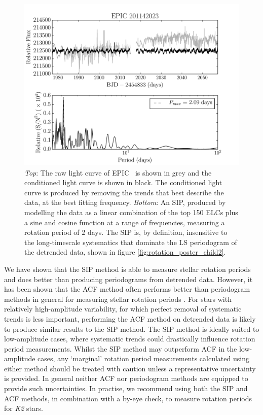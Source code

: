 \begin{figure}
\begin{center}
\includegraphics[width=6in, clip=true]{figures/K2_rotation_201142023.pdf}
\caption{{\it Top}: The raw light curve of EPIC \rpcc\ is shown in grey and
	the conditioned light curve is shown in black. The conditioned light
	curve is produced by removing the trends that best describe the
	data, at the best fitting frequency.
	{\it Bottom}: An SIP, produced by modelling the data as a linear
	combination of the top 150 ELCs plus a sine and cosine function at a
	range of frequencies, measuring a rotation period of 2 days.
	The SIP is, by definition, insensitive to the long-timescale
	systematics that dominate the LS periodogram of the detrended data,
	shown in figure \ref{fig:rotation_poster_child2}.}
\label{fig:K2_rotation_poster_child2}
\end{center}
\end{figure}

We have shown that the SIP method is able to measure stellar rotation periods
and does better than producing periodograms from detrended data.
However, it has been shown that the ACF method often performs better than
periodogram methods in general for measuring stellar rotation periods
\citep[][]{McQuillan2013, McQuillan2013b, Mazeh2015}.
For stars with relatively high-amplitude variability, for which perfect
removal of systematic trends is less important, performing the ACF method
on detrended data is likely to produce similar results to the SIP method.
The SIP method is ideally suited to low-amplitude cases, where systematic
trends could drastically influence rotation period measurements.
Whilst the SIP method may outperform ACF in the low-amplitude cases,
any `marginal' rotation period measurements calculated using either method
should be treated with caution unless a representative uncertainty is provided.
In general neither ACF nor periodogram methods are equipped to provide
such uncertainties.
In practise, we recommend using both the SIP and ACF methods, in combination
with a by-eye check, to measure rotation periods for {\it K2} stars.

